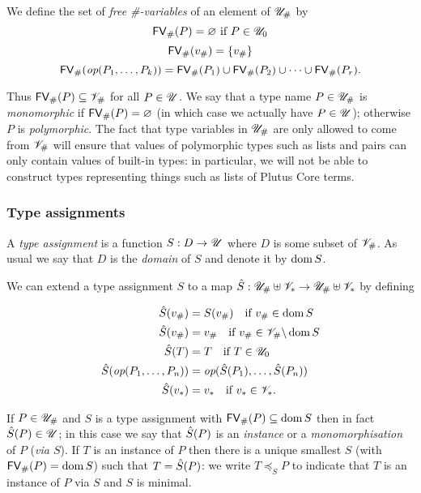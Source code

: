 \noindent We define the set of \textit{free \#-variables} of an element of ${\mathscr{U}_{\#}}$ by
$$
\mathsf{FV}_{\#}(P) = \varnothing \ \text{if $P \in \mathscr{U}_0$}
$$
$$
\mathsf{FV}_{\#}(v_\#) = \{v_\#\}
$$
$$
\mathsf{FV}_{\#}(\textit{op}(P_1, \ldots, P_k)) = \mathsf{FV}_{\#}(P_1) \cup \mathsf{FV}_{\#}(P_2) \cup \cdots \cup \mathsf{FV}_{\#}(P_r).
$$%

\noindent Thus $\mathsf{FV}_{\#}(P) \subseteq \mathscr{V}_\#$ for all $P \in \mathscr{U}$.  We say that a
type name $P \in {\mathscr{U}_{\#}}$ is \textit{monomorphic} if $\mathsf{FV}_{\#}(P) = \varnothing$ (in
which case we actually have $P \in \mathscr{U}$); otherwise $P$ is
\textit{polymorphic}.  The fact that type variables in ${\mathscr{U}_{\#}}$ are only
allowed to come from $\mathscr{V}_\#$ will ensure that values of polymorphic types such
as lists and pairs can only contain values of built-in types: in particular, we
will not be able to construct types representing things such as lists of Plutus
Core terms.


\subsubsection{Type assignments}
\label{sec:type-assignments}
A \textit{type assignment} is a function $S: D \rightarrow \mathscr{U}$ where $D$ is
some subset of $\mathscr{V}_\#$.  As usual we say that $D$ is the \textit{domain} of
$S$ and denote it by $\operatorname{dom} S$.%

\medskip
\noindent We can extend a type assignment $S$ to a map
$\hat{S} : {\mathscr{U}_{\#}} \uplus \mathscr{V}_* \rightarrow {\mathscr{U}_{\#}} \uplus \mathscr{V}_*$ by defining

\begin{align*}
    \hat{S}(v_\#) &= S(v_\#) \quad \text{if $v_\# \in \operatorname{dom} S$}\\
    \hat{S}(v_\#) &= v_\# \quad \text{if $v_\# \in \mathscr{V}_\# \backslash \operatorname{dom} S$}\\
    \hat{S}(T) &= T \quad\text{if $T \in \mathscr{U}_0$}     \\
    \hat{S}(\textit{op}(P_1,\ldots,P_n)) &= \textit{op}(\hat{S}(P_1),\ldots,\hat{S}(P_n))\\
    \hat{S}(v_*) &= v_* \quad \text{if $v_* \in \mathscr{V}_*$}.
\end{align*}%

\noindent If $P \in {\mathscr{U}_{\#}}$ and $S$ is a type assignment with $\mathsf{FV}_{\#}(P)
\subseteq \operatorname{dom} S$ then in fact $\hat{S}(P) \in \mathscr{U}$; in this case we say that
$\hat{S}(P)$ is an \textit{instance} or a \textit{monomorphisation} of $P$
(\textit{via $S$}).  If $T$ is an instance of $P$ then there is a unique
smallest $S$ (with $\mathsf{FV}_{\#}(P)=\operatorname{dom} S$) such that $T = \hat{S}(P)$: we write
$T\preceq_S P$ to indicate that $T$ is an instance of $P$ via $S$ and $S$ is
minimal.%

